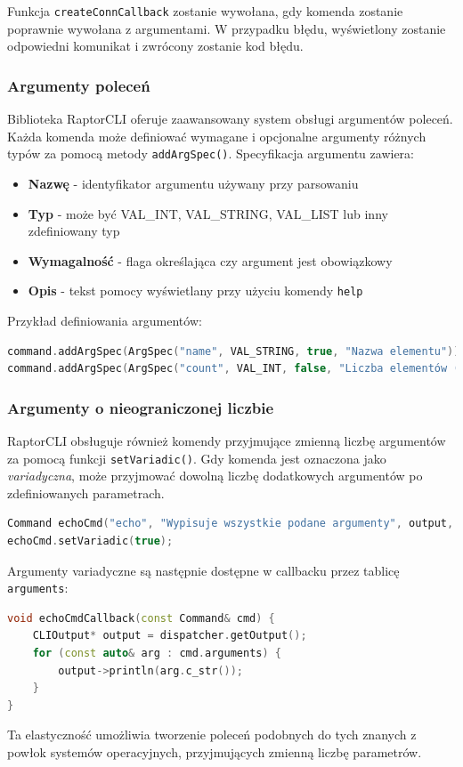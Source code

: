 Funkcja \texttt{createConnCallback} zostanie wywołana, gdy komenda zostanie poprawnie wywołana z argumentami. W przypadku błędu, wyświetlony zostanie odpowiedni komunikat i zwrócony zostanie kod błędu.

\clearpage
\subsubsection{Argumenty poleceń}

Biblioteka RaptorCLI oferuje zaawansowany system obsługi argumentów poleceń. Każda komenda może definiować wymagane i opcjonalne argumenty różnych typów za pomocą metody \texttt{addArgSpec()}. Specyfikacja argumentu zawiera:

\begin{itemize}
	\item \textbf{Nazwę} - identyfikator argumentu używany przy parsowaniu
	\item \textbf{Typ} - może być VAL\_INT, VAL\_STRING, VAL\_LIST lub inny zdefiniowany typ
	\item \textbf{Wymagalność} - flaga określająca czy argument jest obowiązkowy
	\item \textbf{Opis} - tekst pomocy wyświetlany przy użyciu komendy \texttt{help}
\end{itemize}

Przykład definiowania argumentów:
\begin{lstlisting}[language=C++]
command.addArgSpec(ArgSpec("name", VAL_STRING, true, "Nazwa elementu"));
command.addArgSpec(ArgSpec("count", VAL_INT, false, "Liczba elementów (opcjonalne)"));
\end{lstlisting}

\clearpage
\subsubsection{Argumenty o nieograniczonej liczbie}

RaptorCLI obsługuje również komendy przyjmujące zmienną liczbę argumentów za pomocą funkcji \texttt{setVariadic()}. Gdy komenda jest oznaczona jako \textit{variadyczna}, może przyjmować dowolną liczbę dodatkowych argumentów po zdefiniowanych parametrach.

\begin{lstlisting}[language=C++]
Command echoCmd("echo", "Wypisuje wszystkie podane argumenty", output, echoCmdCallback);
echoCmd.setVariadic(true);
\end{lstlisting}
Argumenty variadyczne są następnie dostępne w callbacku przez tablicę \texttt{arguments}:
\begin{lstlisting}[language=C++]
void echoCmdCallback(const Command& cmd) {
	CLIOutput* output = dispatcher.getOutput();
	for (const auto& arg : cmd.arguments) {
		output->println(arg.c_str());
	}
}
\end{lstlisting}
Ta elastyczność umożliwia tworzenie poleceń podobnych do tych znanych z powłok systemów operacyjnych, przyjmujących zmienną liczbę parametrów.

